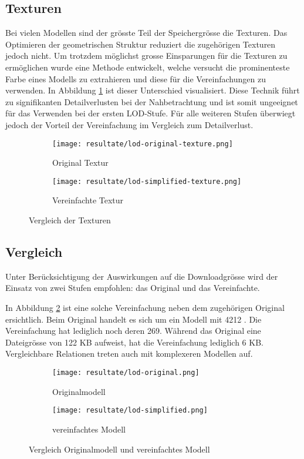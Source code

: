 \subsection{Texturen}

Bei vielen Modellen sind der grösste Teil der Speichergrösse die Texturen. Das Optimieren der geometrischen Struktur reduziert die zugehörigen Texturen jedoch nicht. Um trotzdem möglichst grosse Einsparungen für die Texturen zu ermöglichen wurde eine Methode entwickelt, welche versucht die prominenteste Farbe eines Modells zu extrahieren und diese für die Vereinfachungen zu verwenden.
In Abbildung \ref{fig:textureComparison} ist dieser Unterschied visualisiert.
Diese Technik führt zu signifikanten Detailverlusten bei der Nahbetrachtung und ist somit ungeeignet für das Verwenden bei der ersten LOD-Stufe. Für alle weiteren Stufen überwiegt jedoch der Vorteil der Vereinfachung im Vergleich zum Detailverlust.
\begin{figure}[H]
  \centering
  \begin{subfigure}{.4\textwidth}
    \centering
    \texttt{[image: resultate/lod-original-texture.png]}
    \caption{Original Textur}
  \end{subfigure}
  \begin{subfigure}{.4\textwidth}
    \centering
    \texttt{[image: resultate/lod-simplified-texture.png]}
    \caption{Vereinfachte Textur}
  \end{subfigure}
  \caption{Vergleich der Texturen}
  \label{fig:textureComparison}
\end{figure}

\subsection{Vergleich}

Unter Berücksichtigung der Auswirkungen auf die Downloadgrösse wird der Einsatz von zwei Stufen empfohlen: das Original und das Vereinfachte.

In Abbildung \ref{fig:lodComparison} ist eine solche Vereinfachung neben dem zugehörigen Original ersichtlich. Beim Original handelt es sich um ein Modell mit 4212 . Die Vereinfachung hat lediglich noch deren 269. Während das Original eine Dateigrösse von 122 KB aufweist, hat die Vereinfachung lediglich 6 KB. Vergleichbare Relationen treten auch mit komplexeren Modellen auf.

\begin{figure}[H]
  \centering
  \begin{subfigure}{.4\textwidth}
    \centering
    \texttt{[image: resultate/lod-original.png]}
    \caption{Originalmodell}
  \end{subfigure}
  \begin{subfigure}{.4\textwidth}
    \centering
    \texttt{[image: resultate/lod-simplified.png]}
    \caption{vereinfachtes Modell}
  \end{subfigure}
  \caption{Vergleich Originalmodell und vereinfachtes Modell}
  \label{fig:lodComparison}
\end{figure}

